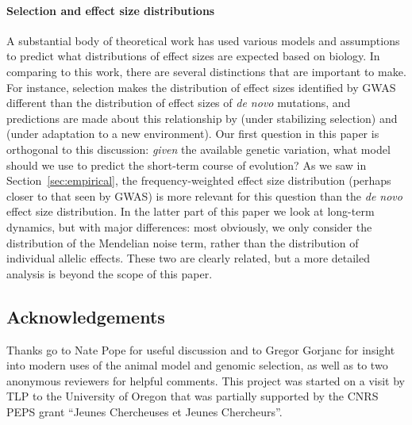 \documentclass{article}
\newcommand{\1}{\mathbbm{1}}
\theoremstyle{remark}
\theoremstyle{definition}
\begin{document}
\paragraph{Selection and effect size distributions} 
A substantial body of theoretical work has used various models and assumptions
to predict what distributions of effect sizes are expected based on biology.
In comparing to this work, there are several distinctions that are important to make.
For instance, selection makes the distribution of effect sizes identified by GWAS
different than the distribution of effect sizes of \emph{de novo} mutations,
and predictions are made about this relationship by \citet{simons2018population} %
(under stabilizing selection)
and \citet{hayward2022polygenic}
(under adaptation to a new environment).
Our first question in this paper is orthogonal to this discussion:
\emph{given} the available genetic variation,
what model should we use to predict the short-term course of evolution?
As we saw in Section~\ref{sec:empirical},
the frequency-weighted effect size distribution (perhaps closer to that seen by GWAS)
is more relevant for this question than the \emph{de novo} effect size distribution.
In the latter part of this paper we look at long-term dynamics,
but with major differences:
most obviously, we only consider the distribution of the Mendelian noise term,
rather than the distribution of individual allelic effects.
These two are clearly related, but a more detailed analysis is beyond the scope of this paper.

\subsection*{Acknowledgements}
Thanks go to Nate Pope for useful discussion
and to Gregor Gorjanc for insight into modern uses
of the animal model and genomic selection,
as well as to two anonymous reviewers for helpful comments.
This project was started on a visit by TLP to the University of Oregon that was partially supported by the CNRS PEPS grant ``Jeunes Chercheuses et Jeunes Chercheurs''.




\appendix
\setcounter{table}{0}
\renewcommand{\thetable}{S\arabic{table}}
\setcounter{figure}{0}
\renewcommand{\thefigure}{S\arabic{figure}}
\end{document}
